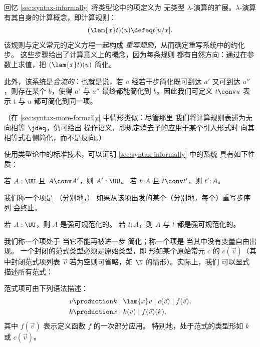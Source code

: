 回忆 \cref{sec:syntax-informally} 将类型论中的项定义为
无类型 $\lambda$-演算的扩展。$\lambda$-演算
有其自身的计算概念，即计算规则：
\[
  (\lam{x} t)(u) \defeq t[u/x].
\]
该规则与定义常元的定义方程一起构成
\emph{重写规则}，从而确定重写系统中的约化步。
这些步骤给出了计算意义上的概念，因为每条规则
都有自然方向：通过在参数上求值，把 $(\lam{x} t)(u)$ 简化。

此外，该系统是\emph{合流的}：也就是说，若 $a$ 经若干步简化既可到达 $a'$ 又可到达 $a''$，则存在某个 $b$，使得 $a'$ 与
$a''$ 最终都能简化到 $b$。因此我们可定义 $t\conv u$
表示 $t$ 与 $u$ 都可简化到同一项。

（在 \cref{sec:syntax-more-formally} 中情形类似：尽管那里
我们将计算规则表述为无向相等 $\jdeq$，仍可给出
操作语义，即规定消去子的应用于某个引入形式时
向其相等式右侧简化，而不是反向。）

使用类型论中的标准技术，可以证明 \cref{sec:syntax-informally} 中的系统
具有如下性质：

\begin{thm}\label{thm:conversion-preserves-typing}
若 $A : \UU$ 且 $A \conv A'$，则 $A' : \UU$。
若 $t:A$ 且 $t \conv t'$，则 $t':A$。
\end{thm}

我们称一个项是
%
%
%
（分别地，）
%
%
%
如果从该项出发的某个（分别地，每个）重写步序列
会终止。

\begin{thm}\label{thm:strong-normalization}
若 $A : \UU$，则 $A$ 是强可规范化的。
若 $t:A$，则 $A$ 与 $t$ 都是强可规范化的。
\end{thm}

我们称一个项处于
%
%
当它不能再被进一步
简化；称一个项是
%
%
当其中没有变量自由出现。
一个封闭的范式类型必须是原始类型，即
形如某个原始常元 $c$ 的 $c(\vec{v})$（其中封闭范式项列表 $\vec{v}$
若为空则可省略，如 $\N$ 的情形）。实际上，我们
可以显式描述所有范式：

\begin{lem}\label{lem:normal-forms}
  范式项可由下列语法描述：
  \begin{align*}
    v & \production  k \mid \lam{x} v \mid c(\vec{v}) \mid f(\vec{v}), \\
    k &\production x \mid k(v) \mid f(\vec{v})(k),
  \end{align*}
  其中 $f(\vec{v})$ 表示定义函数 $f$ 的一次部分应用。
  特别地，处于范式的类型形如 $k$ 或 $c(\vec{v})$。
\end{lem}

